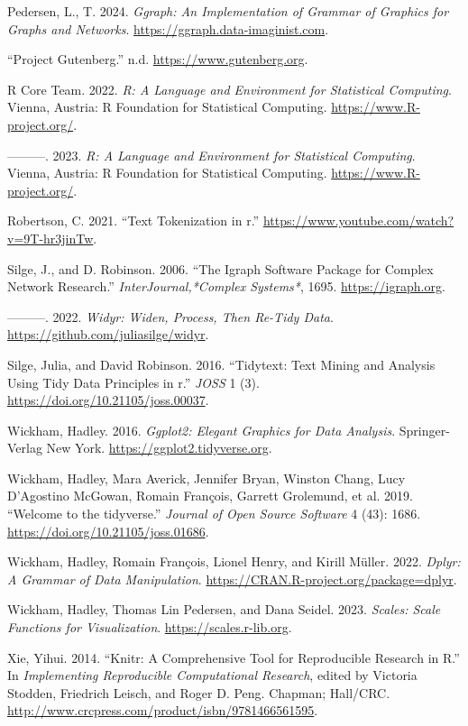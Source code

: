 \documentclass[
  letterpaper,
  DIV=11,
  numbers=noendperiod]{scrartcl}
\newlength{\cslhangindent}
\newenvironment{CSLReferences}[2] %
 {\begin{list}{}{%
  \setlength{\itemindent}{0pt}
  \setlength{\leftmargin}{0pt}
  \setlength{\parsep}{0pt}
  \ifodd #1
   \setlength{\leftmargin}{\cslhangindent}
   \setlength{\itemindent}{-1\cslhangindent}
  \fi
  \setlength{\itemsep}{#2\baselineskip}}}
 {\end{list}}
\begin{document}
\begin{CSLReferences}{1}{0}
Pedersen, L., T. 2024. \emph{Ggraph: An Implementation of Grammar of
Graphics for Graphs and Networks}.
\url{https://ggraph.data-imaginist.com}.

{``Project Gutenberg.''} n.d. \url{https://www.gutenberg.org}.

R Core Team. 2022. \emph{R: A Language and Environment for Statistical
Computing}. Vienna, Austria: R Foundation for Statistical Computing.
\url{https://www.R-project.org/}.

---------. 2023. \emph{R: A Language and Environment for Statistical
Computing}. Vienna, Austria: R Foundation for Statistical Computing.
\url{https://www.R-project.org/}.

Robertson, C. 2021. {``Text Tokenization in r.''}
\url{https://www.youtube.com/watch?v=9T-hr3jinTw}.

Silge, J., and D. Robinson. 2006. {``The Igraph Software Package for
Complex Network Research.''} \emph{InterJournal,*Complex Systems*},
1695. \url{https://igraph.org}.

---------. 2022. \emph{Widyr: Widen, Process, Then Re-Tidy Data}.
\url{https://github.com/juliasilge/widyr}.

Silge, Julia, and David Robinson. 2016. {``Tidytext: Text Mining and
Analysis Using Tidy Data Principles in r.''} \emph{JOSS} 1 (3).
\url{https://doi.org/10.21105/joss.00037}.

Wickham, Hadley. 2016. \emph{Ggplot2: Elegant Graphics for Data
Analysis}. Springer-Verlag New York.
\url{https://ggplot2.tidyverse.org}.

Wickham, Hadley, Mara Averick, Jennifer Bryan, Winston Chang, Lucy
D'Agostino McGowan, Romain François, Garrett Grolemund, et al. 2019.
{``Welcome to the {tidyverse}.''} \emph{Journal of Open Source Software}
4 (43): 1686. \url{https://doi.org/10.21105/joss.01686}.

Wickham, Hadley, Romain François, Lionel Henry, and Kirill Müller. 2022.
\emph{Dplyr: A Grammar of Data Manipulation}.
\url{https://CRAN.R-project.org/package=dplyr}.

Wickham, Hadley, Thomas Lin Pedersen, and Dana Seidel. 2023.
\emph{Scales: Scale Functions for Visualization}.
\url{https://scales.r-lib.org}.

Xie, Yihui. 2014. {``Knitr: A Comprehensive Tool for Reproducible
Research in {R}.''} In \emph{Implementing Reproducible Computational
Research}, edited by Victoria Stodden, Friedrich Leisch, and Roger D.
Peng. Chapman; Hall/CRC.
\url{http://www.crcpress.com/product/isbn/9781466561595}.

\end{CSLReferences}
\end{document}
